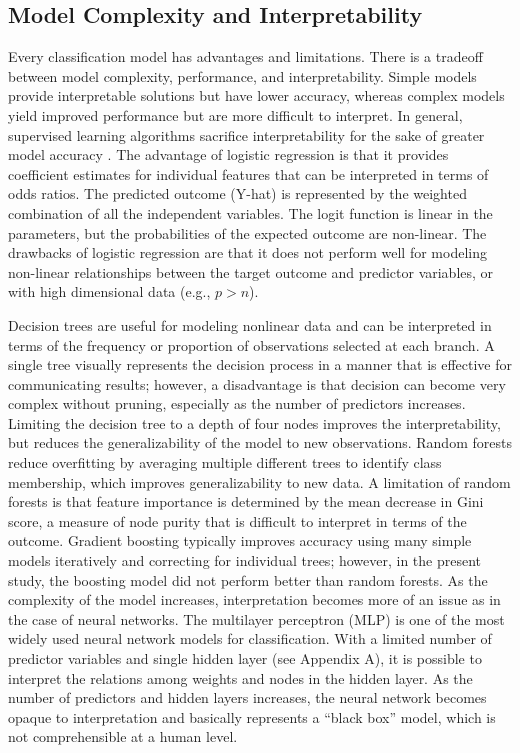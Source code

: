 \documentclass[sigconf]{acmart}
\begin{document}
\subsection{Model Complexity and Interpretability}

Every classification model has advantages and limitations. There is a 
tradeoff between model complexity, performance, and interpretability.
Simple models provide interpretable solutions but have lower accuracy, 
whereas complex models yield improved performance but are more difficult 
to interpret. In general, supervised learning algorithms sacrifice 
interpretability for the sake of greater model accuracy \cite{elgin18}. 
The advantage of logistic regression is that it provides coefficient 
estimates for individual features that can be interpreted in terms of odds 
ratios. The predicted outcome (Y-hat) is represented by the weighted 
combination of all the independent variables. The logit function is linear 
in the parameters, but the probabilities of the expected outcome are 
non-linear. The drawbacks of logistic regression are that it does not 
perform well for modeling non-linear relationships between the target
outcome and predictor variables, or with high dimensional data (e.g., $p>n$). 

Decision trees are useful for modeling nonlinear data and can be 
interpreted in terms of the frequency or proportion of observations selected 
at each branch. A single tree visually represents the decision process in a 
manner that is effective for communicating results; however, a disadvantage 
is that decision can become very complex without pruning, especially as the 
number of predictors increases. Limiting the decision tree to a depth of four 
nodes improves the interpretability, but reduces the generalizability of the 
model to new observations. Random forests reduce overfitting by averaging
multiple different trees to identify class membership, which improves 
generalizability to new data. A limitation of random forests is that feature 
importance is determined by the mean decrease in Gini score, a measure of node
purity that is difficult to interpret in terms of the outcome. Gradient 
boosting typically improves accuracy using many simple models iteratively and 
correcting for individual trees; however, in the present study, the boosting 
model did not perform better than random forests. As the complexity of the
model increases, interpretation becomes more of an issue as in the case of 
neural networks. The multilayer perceptron (MLP) is one of the most widely 
used neural network models for classification. With a limited number of 
predictor variables and single hidden layer (see Appendix A), it is possible 
to interpret the relations among weights and nodes in the hidden layer. As 
the number of predictors and hidden layers increases, the neural network 
becomes opaque to interpretation and basically represents a ``black box'' 
model, which is not comprehensible at a human level. 
\end{document}
